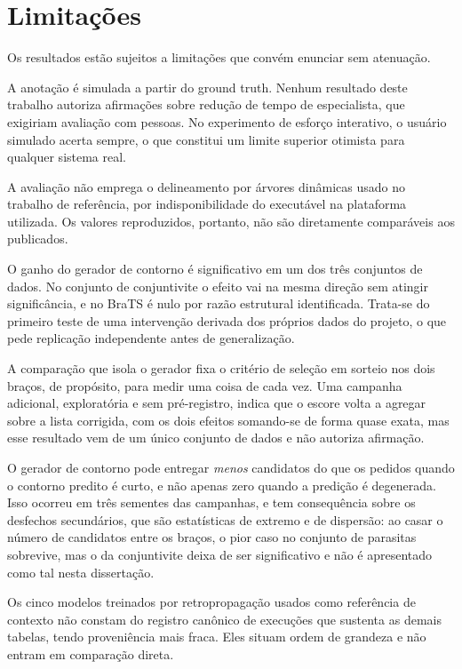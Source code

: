 \section{Limitações}

Os resultados estão sujeitos a limitações que convém enunciar sem atenuação.

A anotação é simulada a partir do ground truth. Nenhum resultado deste trabalho autoriza afirmações sobre redução de tempo de especialista, que exigiriam avaliação com pessoas. No experimento de esforço interativo, o usuário simulado acerta sempre, o que constitui um limite superior otimista para qualquer sistema real.

A avaliação não emprega o delineamento por árvores dinâmicas usado no trabalho de referência, por indisponibilidade do executável na plataforma utilizada. Os valores reproduzidos, portanto, não são diretamente comparáveis aos publicados.

O ganho do gerador de contorno é significativo em um dos três conjuntos de dados. No conjunto de conjuntivite o efeito vai na mesma direção sem atingir significância, e no BraTS é nulo por razão estrutural identificada. Trata-se do primeiro teste de uma intervenção derivada dos próprios dados do projeto, o que pede replicação independente antes de generalização.

A comparação que isola o gerador fixa o critério de seleção em sorteio nos dois braços, de propósito, para medir uma coisa de cada vez. Uma campanha adicional, exploratória e sem pré-registro, indica que o escore volta a agregar sobre a lista corrigida, com os dois efeitos somando-se de forma quase exata, mas esse resultado vem de um único conjunto de dados e não autoriza afirmação.

O gerador de contorno pode entregar \emph{menos} candidatos do que os pedidos quando o contorno predito é curto, e não apenas zero quando a predição é degenerada. Isso ocorreu em três sementes das campanhas, e tem consequência sobre os desfechos secundários, que são estatísticas de extremo e de dispersão: ao casar o número de candidatos entre os braços, o pior caso no conjunto de parasitas sobrevive, mas o da conjuntivite deixa de ser significativo e não é apresentado como tal nesta dissertação.

Os cinco modelos treinados por retropropagação usados como referência de contexto não constam do registro canônico de execuções que sustenta as demais tabelas, tendo proveniência mais fraca. Eles situam ordem de grandeza e não entram em comparação direta.


